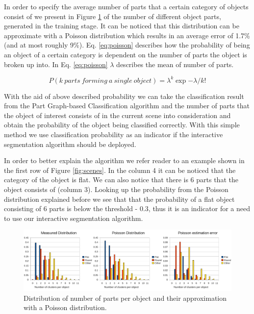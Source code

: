 In order to specify the average number of parts that a certain category of objects consist of we present in Figure \ref{fig:poisson} of the number of different object parts, generated in the training stage. It can be noticed that this distribution can be approximate with a Poisson distribution which results in an average error of 1.7\% (and at most roughly 9\%). Eq. \ref{eq:poisson} describes how the probability of being an object of a certain category is dependent on the number of parts the object is broken up into. 
In Eq. \ref{eq:poisson} $\lambda$ describes the mean of number of parts.

\begin{equation}
\label{eq:poisson}
P(k~parts~forming~a~single~object) = \lambda^k \exp{-\lambda} / k!
\end{equation}

With the aid of above described probability we can take the classification result from the Part Graph-based Classification algorithm and the number of parts that the object of interest consists of in the current scene into consideration and obtain the probability of the object being classified correctly. With this simple method we use classification probability as an indicator if the interactive segmentation algorithm should be deployed.  

In order to better explain the algorithm we refer reader to an example shown in the first row of Figure \ref{fig:scenes}. In the column 4 it can be noticed that the category of the object is flat. We can also notice that there is 6 parts that the object consists of (column 3). Looking up the probability from the Poisson distribution explained before we see that that the probability of a flat object consisting of 6 parts is below the threshold - $0.3$, thus it is an indicator for a need to use our interactive segmentation algorithm.



\begin{figure}[h!]
\centering
  \includegraphics[width=0.98\columnwidth, trim=0ex 0ex 53ex 0ex, clip]{figures/dataset_stats.pdf}
	\vspace{-2ex}
  \caption{Distribution of number of parts per object and their approximation with a Poisson distribution.}
  \label{fig:poisson}
\end{figure}

